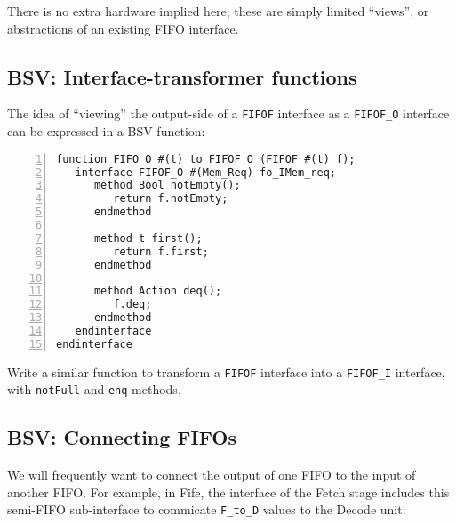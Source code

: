 There is no extra hardware implied here; these are simply limited
``views'', or abstractions of an existing FIFO interface.


\subsection{BSV: Interface-transformer functions}

\label{Sec_interface_transfomers}


The idea of ``viewing'' the output-side of a \verb|FIFOF| interface as
a \verb|FIFOF_O| interface can be expressed in a BSV function:

{\small
\begin{Verbatim}[frame=single, numbers=left]
function FIFO_O #(t) to_FIFOF_O (FIFOF #(t) f);
   interface FIFOF_O #(Mem_Req) fo_IMem_req;
      method Bool notEmpty();
         return f.notEmpty;
      endmethod

      method t first();
         return f.first;
      endmethod

      method Action deq();
         f.deq;
      endmethod
   endinterface
endinterface
\end{Verbatim}
}

\hdivider

\Exercise

Write a similar function to transform a \verb|FIFOF| interface into a
\verb|FIFOF_I| interface, with \verb|notFull| and \verb|enq| methods.

\Endexercise


\subsection{BSV: Connecting FIFOs}

\label{Sec_connecting_FIFOs}


We will frequently want to connect the output of one FIFO to the input
of another FIFO.  For example, in Fife, the interface of the Fetch
stage includes this semi-FIFO sub-interface to commicate \verb|F_to_D|
values to the Decode unit:

